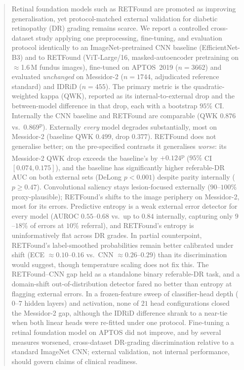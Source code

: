 \documentclass[journal]{IEEEtran}
\newcommand{\pv}[1]{#1\textsuperscript{p}}
\renewcommand{\_}{\origunderscore\allowbreak}
\begin{document}
\begin{abstract}
Retinal foundation models such as RETFound are promoted as improving
generalisation, yet protocol-matched external validation for diabetic
retinopathy (DR) grading remains scarce. We report a controlled cross-dataset
study applying one preprocessing, fine-tuning, and evaluation protocol
identically to an ImageNet-pretrained CNN baseline (EfficientNet-B3) and to
RETFound (ViT-Large/16, masked-autoencoder pretraining on $\approx$1.6\,M
fundus images), fine-tuned on APTOS~2019 ($n=3662$) and evaluated
\emph{unchanged} on Messidor-2 ($n=1744$, adjudicated reference standard) and
IDRiD ($n=455$). The primary metric is the quadratic-weighted kappa (QWK),
reported as its internal-to-external drop and the between-model difference in
that drop, each with a bootstrap $95\%$ CI. Internally the CNN baseline and
RETFound are comparable (QWK $0.876$ vs.\ \pv{$0.869$}). Externally
\emph{every} model degrades substantially, most on Messidor-2 (baseline QWK
$0.499$, drop $0.377$). RETFound does not generalise better; on the
pre-specified contrasts it generalises \emph{worse}: its Messidor-2 QWK drop
exceeds the baseline's by \pv{$+0.124$} ($95\%$ CI $[0.074,0.175]$), and the
baseline has significantly higher referable-DR AUC on both external sets
(DeLong $p<0.001$) despite parity internally ($p\geq0.47$). Convolutional
saliency stays lesion-focused externally ($90$--$100\%$ proxy-plausible);
RETFound's shifts to the image periphery on Messidor-2, most for its errors.
Predictive entropy is a weak external error detector for every model (AUROC
$0.55$--$0.68$ vs.\ up to $0.84$ internally, capturing only $9$--$18\%$ of
errors at $10\%$ referral), and RETFound's entropy is uninformatively flat
across DR grades. In partial counterpoint, RETFound's label-smoothed
probabilities remain better calibrated under shift (ECE $\approx0.10$--$0.16$
vs.\ CNN $\approx0.26$--$0.29$) than its discrimination would suggest, though
temperature scaling does not fix this. The RETFound--CNN gap held as a
standalone binary referable-DR task, and a domain-shift out-of-distribution
detector fared no better than entropy at flagging external errors.
In a frozen-feature sweep of classifier-head depth ($0$--$7$ hidden layers) and activation, none of $21$ head configurations closed the Messidor-2 gap, although the IDRiD difference shrank to a near-tie when both linear heads were re-fitted under one protocol.
Fine-tuning a retinal foundation model on APTOS did not improve, and by
several measures worsened, cross-dataset DR-grading discrimination relative
to a standard ImageNet CNN; external validation, not internal performance,
should govern claims of clinical readiness.
\end{abstract}
\end{document}
